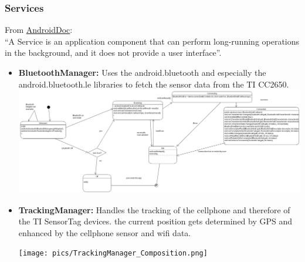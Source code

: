 \subsubsection{Services}
From \href{https://developer.android.com/guide/components/services.html}{AndroidDoc}: \\
``A Service is an application component that can perform long-running operations in the background, and it does not provide a user interface''.
\begin{itemize}
  \item \textbf{BluetoothManager:} Uses the android.bluetooth and especially the android.bluetooth.le libraries to fetch the sensor data from the TI CC2650. \\
  \includegraphics[scale=0.2]{pics/bt_state.png}
  \item \textbf{TrackingManager:} Handles the tracking of the cellphone and therefore of the TI SensorTag devices. the current position gets determined by GPS and enhanced by the cellphone sensor and wifi data.
  \begin{center}
  \texttt{[image: pics/TrackingManager\_Composition.png]}
  \end{center}


\end{itemize}
